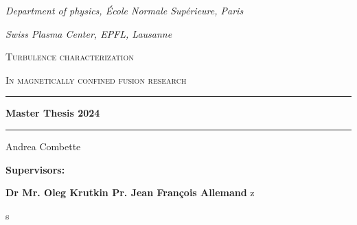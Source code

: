 \documentclass[11pt,a4paper]{report}
\author{Andrea}
\begin{document}
\begin{titlepage}
    \begin{center}
        \vspace*{2cm}
        \emph{\footnotesize{Department of physics, École Normale Supérieure, Paris}}

        \emph{\footnotesize{Swiss Plasma Center, EPFL, Lausanne}}


        \vspace*{1cm}

        \textsc{Turbulence characterization}

        \textsc{In magnetically confined fusion research}
        \vspace*{1cm}

        \rule{14cm}{2pt}\vspace{.7cm}

        \Large{\textbf{Master Thesis 2024}}

        \vspace{.5cm}
        \rule{14cm}{2pt}
        \vspace{1cm}

        \Large Andrea Combette

        \vspace{3cm}

        \raisebox{-5pt}{\quad\decofourleft\decotwo\decofourright\quad}

        \vspace{2cm}
        \vspace{1cm}

        \begin{minipage}{14cm}
            \small{\textbf{Supervisors:}}
            \vspace{.5cm}

            \small{\textbf{Dr Mr. Oleg Krutkin \null\hfill Pr. Jean François Allemand}}
            z
        \end{minipage}s
        \vspace{2cm}



\end{center}
\end{titlepage}
\end{document}
